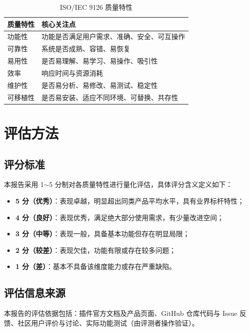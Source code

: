 \documentclass[UTF8,a4paper,10pt]{ctexart}
\begin{document}
\begin{table}[htbp]
\centering
\caption{ISO/IEC 9126 质量特性}
\label{tab:iso9126}
\begin{tabular}{p{3cm}p{8cm}}
\toprule
\textbf{质量特性} & \textbf{核心关注点} \\
\midrule
功能性 & 功能是否满足用户需求、准确、安全、可互操作 \\
可靠性 & 系统是否成熟、容错、易恢复 \\
易用性 & 是否易理解、易学习、易操作、吸引性 \\
效率 & 响应时间与资源消耗 \\
维护性 & 是否易分析、易修改、易测试、稳定性 \\
可移植性 & 是否易安装、适应不同环境、可替换、共存性 \\
\bottomrule
\end{tabular}
\end{table}

\section{评估方法}

\subsection{评分标准}
本报告采用 1$\sim$5 分制对各质量特性进行量化评估，具体评分含义定义如下：

\begin{itemize}
    \item \textbf{5 分（优秀）}：表现卓越，明显超出同类产品平均水平，具有业界标杆特性；
    \item \textbf{4 分（良好）}：表现优秀，满足绝大部分使用需求，有少量改进空间；
    \item \textbf{3 分（中等）}：表现一般，具备基本功能但存在明显局限；
    \item \textbf{2 分（较差）}：表现欠佳，功能有限或存在较多问题；
    \item \textbf{1 分（差）}：基本不具备该维度能力或存在严重缺陷。
\end{itemize}

\subsection{评估信息来源}
本报告的评估依据包括：插件官方文档及产品页面、GitHub 仓库代码与 Issue 反馈、社区用户评价与讨论、实际功能测试（由评测者操作验证）。
\end{document}
